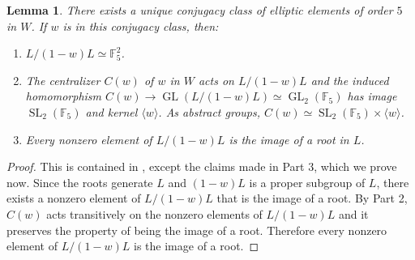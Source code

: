 \documentclass{article} %
\newtheorem{lemma}[proposition]{Lemma}
\numberwithin{equation}{section}
\theoremstyle{definition}
\DeclareMathOperator{\GL}{GL}
\DeclareMathOperator{\SL}{SL}
\begin{document}
\begin{lemma}\label{lemma:propertiesellipticelementorder5E8}
There exists a unique conjugacy class of elliptic elements of order $5$ in $W$. If $w$ is in this conjugacy class, then: 
\begin{enumerate}
    \item $L/(1-w)L\simeq \mathbb{F}_5^2$.
    \item The centralizer $C(w)$ of $w$ in $W$ acts on $L/(1-w)L$ and the induced homomorphism $C(w) \rightarrow \GL(L/(1-w)L)\simeq \GL_2(\mathbb{F}_5)$ has image $\SL_2(\mathbb{F}_5)$ and kernel $\langle w\rangle$. As abstract groups, $C(w) \simeq \SL_2(\mathbb{F}_5) \times \langle w\rangle$.
    \item Every nonzero element of $L/(1-w)L$ is the image of a root in $L$.
\end{enumerate}
\end{lemma}
\begin{proof}
    This is contained in \cite[Table 1 and \S4.2.1]{reeder-ellipticcentralizers}, except the claims made in Part 3, which we prove now.
    Since the roots generate $L$ and $(1-w)L$ is a proper subgroup of $L$, there exists a nonzero element of $L/(1-w)L$ that is the image of a root.
    By Part 2, $C(w)$ acts transitively on the nonzero elements of $L/(1-w)L$ and it preserves the property of being the image of a root. 
    Therefore every nonzero element of $L/(1-w)L$ is the image of a root.
\end{proof}
\end{document}
